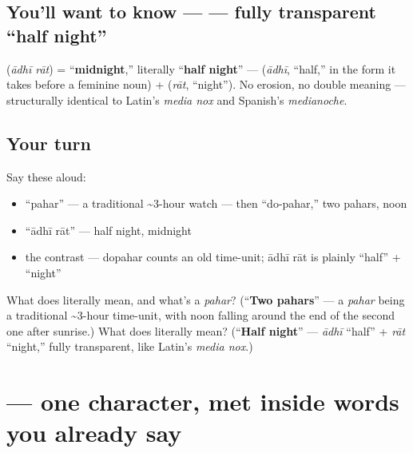 \subsection*{You'll want to know —   — fully transparent \textquotedblleft{}half night\textquotedblright{}}
\textbf{ } (\emph{ādhī rāt}) = \textquotedblleft{}\textbf{midnight},\textquotedblright{} literally \textquotedblleft{}\textbf{half night}\textquotedblright{} — \textbf{} (\emph{ādhī}, \textquotedblleft{}half,\textquotedblright{} in the form it takes before a feminine noun) + \textbf{} (\emph{rāt}, \textquotedblleft{}night\textquotedblright{}). No erosion, no double meaning — structurally identical to Latin's \emph{media nox} and Spanish's \emph{medianoche}.

\subsection*{Your turn}
Say these aloud:

\begin{itemize}
\raggedright
  \item \textquotedblleft{}pahar\textquotedblright{} — a traditional \textasciitilde{}3-hour watch — then \textquotedblleft{}do-pahar,\textquotedblright{} two pahars, noon
  \item \textquotedblleft{}ādhī rāt\textquotedblright{} — half night, midnight
  \item the contrast — dopahar counts an old time-unit; ādhī rāt is plainly \textquotedblleft{}half\textquotedblright{} + \textquotedblleft{}night\textquotedblright{}
\end{itemize}

\begin{tcolorbox}[breakable,colback=teal!4,colframe=teal!35!black,title={Before you move on}]
What does \textbf{} literally mean, and what's a \emph{pahar}? (\textquotedblleft{}\textbf{Two pahars}\textquotedblright{} — a \emph{pahar} being a traditional \textasciitilde{}3-hour time-unit, with noon falling around the end of the second one after sunrise.) What does \textbf{ } literally mean? (\textquotedblleft{}\textbf{Half night}\textquotedblright{} — \emph{ādhī} \textquotedblleft{}half\textquotedblright{} + \emph{rāt} \textquotedblleft{}night,\textquotedblright{} fully transparent, like Latin's \emph{media nox}.)
\end{tcolorbox}
\section[\texorpdfstring{\hi{ल} (la)}{ल (la)}]{ — one character, met inside words you already say}

